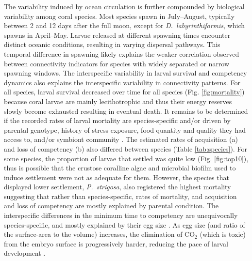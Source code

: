\documentclass[preprint,12pt,authoryear]{elsarticle}
\begin{document}
	The variability induced by ocean circulation is further compounded by biological variability among coral species. Most species spawn in July–August, typically between 2 and 12 days after the full moon, except for \textit{D.~labyrinthiformis}, which spawns in April–May. Larvae released at different spawning times encounter distinct oceanic conditions, resulting in varying dispersal pathways. This temporal difference in spawning likely explains the weaker correlation observed between connectivity indicators for species with widely separated or narrow spawning windows. The interspecific variability in larval survival and competency dynamics also explains the interspecific variability in connectivity patterns. For all species, larval survival decreased over time for all species (Fig. \ref{fig:mortality}) because coral larvae are mainly lecithotrophic and thus their energy reserves slowly become exhausted resulting in eventual death. It remains to be determined if the recorded rates of larval mortality are species-specific and/or driven by parental genotype, history of stress exposure, food quantity and quality they had access to, and/or symbiont community \citep{jones2011tradeoffs, baums2013genotypic, padilla2013all, kirk2018genomic}. The estimated rates of acquisition (a) and loss of competency (b) also differed between species (Table \ref{tab:species}). For some species, the proportion of larvae that settled was quite low (Fig. \ref{fig:top10}), thus is possible that the crustose coralline algae and microbial biofilm used to induce settlement were not as adequate for them. However, the species that displayed lower settlement, \textit{P.~strigosa}, also registered the highest mortality suggesting that rather than species-specific, rates of mortality, and acquisition and loss of competency are mostly explained by parental condition. The interspecific differences in the minimum time to competency are unequivocally species-specific, and mostly explained by their egg size \citep{figueiredo2013synthesizing, figueiredo2025predicting}. As egg size (and ratio of the surface-area to the volume) increases, the elimination of CO$_2$ (which is toxic) from the embryo surface is progressively harder, reducing the pace of larval development \citep{berrill1935cell, einum2002egg}.
	
\end{document}
